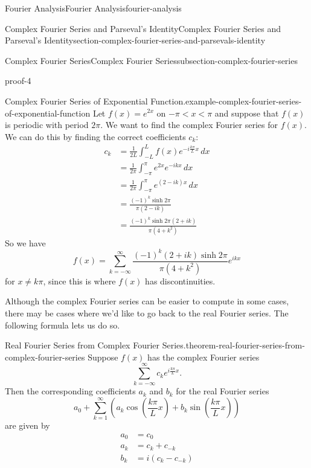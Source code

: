 \documentclass[oneside,10pt,]{book}
\numberwithin{equation}{section}
\newcommand{\amp}{&}
\begin{document}
\begin{chapterptx}{Fourier Analysis}{}{Fourier Analysis}{}{}{fourier-analysis}
\begin{sectionptx}{Complex Fourier Series and Parseval's Identity}{}{Complex Fourier Series and Parseval's Identity}{}{}{section-complex-fourier-series-and-parsevals-identity}
\begin{subsectionptx}{Complex Fourier Series}{}{Complex Fourier Series}{}{}{subsection-complex-fourier-series}
\begin{proofptx}{}{proof-4}
\begin{equation*}
\end{equation*}
%
\end{proofptx}
\begin{example}{Complex Fourier Series of Exponential Function.}{example-complex-fourier-series-of-exponential-function}%
\hypertarget{p-605}{}%
Let \(f(x) = e^{2x}\) on \(-\pi<x<\pi\) and suppose that \(f(x)\) is periodic with period \(2\pi\). We want to find the complex Fourier series for \(f(x)\). We can do this by finding the correct coefficients \(c_{k}\):%
\begin{align*}
c_{k} \amp = \frac{1}{2L}\int_{-L}^{L}f(x)e^{-i\frac{k\pi}{L}x}\,dx\\
\amp = \frac{1}{2\pi}\int_{-\pi}^{\pi}e^{2x}e^{-ikx}\,dx \\
\amp = \frac{1}{2\pi}\int_{-\pi}^{\pi}e^{(2-ik)x}\,dx \\
\amp = \frac{(-1)^{k}\sinh2\pi}{\pi(2-ik)} \\
\amp = \frac{(-1)^{k}\sinh2\pi(2+ik)}{\pi(4+k^{2})}
\end{align*}
So we have%
\begin{equation*}
f(x) = \sum_{k=-\infty}^{\infty}\frac{(-1)^{k}(2+ik)\sinh2\pi}{\pi(4+k^{2})}e^{ikx}
\end{equation*}
for \(x\neq k\pi\), since this is where \(f(x)\) has discontinuities.%
\end{example}
\hypertarget{p-606}{}%
Although the complex Fourier series can be easier to compute in some cases, there may be cases where we'd like to go back to the real Fourier series. The following formula lets us do so.%
\begin{theorem}{Real Fourier Series from Complex Fourier Series.}{}{theorem-real-fourier-series-from-complex-fourier-series}%
\hypertarget{p-607}{}%
Suppose \(f(x)\) has the complex Fourier series%
\begin{equation*}
\sum_{k=-\infty}^{\infty}c_{k}e^{i\frac{k\pi}{L}x}.
\end{equation*}
Then the corresponding coefficients \(a_{k}\) and \(b_{k}\) for the real Fourier series%
\begin{equation*}
a_{0} + \sum_{k=1}^{\infty}\left(a_{k}\cos\left(\frac{k\pi}{L}x\right)+b_{k}\sin\left(\frac{k\pi}{L}x\right)\right)
\end{equation*}
are given by%
\begin{align*}
a_{0} \amp = c_{0} \\
a_{k} \amp = c_{k} + c_{-k} \\
b_{k} \amp = i(c_{k}-c_{-k}) 

\end{align*}
\end{theorem}
\end{subsectionptx}
\end{sectionptx}
\end{chapterptx}
\end{document}
